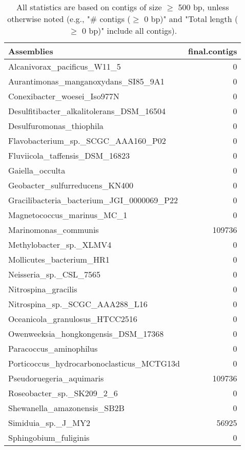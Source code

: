 \documentclass[12pt,a4paper]{article}
\begin{document}
\begin{table}[ht]
\begin{center}
\caption{All statistics are based on contigs of size $\geq$ 500 bp, unless otherwise noted (e.g., "\# contigs ($\geq$ 0 bp)" and "Total length ($\geq$ 0 bp)" include all contigs).}
\begin{tabular}{|l*{1}{|r}|}
\hline
Assemblies & final.contigs \\ \hline
Alcanivorax\_pacificus\_W11\_5 & 0 \\ \hline
Aurantimonas\_manganoxydans\_SI85\_9A1 & 0 \\ \hline
Conexibacter\_woesei\_Iso977N & 0 \\ \hline
Desulfitibacter\_alkalitolerans\_DSM\_16504 & 0 \\ \hline
Desulfuromonas\_thiophila & 0 \\ \hline
Flavobacterium\_sp.\_SCGC\_AAA160\_P02 & 0 \\ \hline
Fluviicola\_taffensis\_DSM\_16823 & 0 \\ \hline
Gaiella\_occulta & 0 \\ \hline
Geobacter\_sulfurreducens\_KN400 & 0 \\ \hline
Gracilibacteria\_bacterium\_JGI\_0000069\_P22 & 0 \\ \hline
Magnetococcus\_marinus\_MC\_1 & 0 \\ \hline
Marinomonas\_communis & 109736 \\ \hline
Methylobacter\_sp.\_XLMV4 & 0 \\ \hline
Mollicutes\_bacterium\_HR1 & 0 \\ \hline
Neisseria\_sp.\_CSL\_7565 & 0 \\ \hline
Nitrospina\_gracilis & 0 \\ \hline
Nitrospina\_sp.\_SCGC\_AAA288\_L16 & 0 \\ \hline
Oceanicola\_granulosus\_HTCC2516 & 0 \\ \hline
Owenweeksia\_hongkongensis\_DSM\_17368 & 0 \\ \hline
Paracoccus\_aminophilus & 0 \\ \hline
Porticoccus\_hydrocarbonoclasticus\_MCTG13d & 0 \\ \hline
Pseudoruegeria\_aquimaris & 109736 \\ \hline
Roseobacter\_sp.\_SK209\_2\_6 & 0 \\ \hline
Shewanella\_amazonensis\_SB2B & 0 \\ \hline
Simiduia\_sp.\_J\_MY2 & 56925 \\ \hline
Sphingobium\_fuliginis & 0 \\ \hline

\end{tabular}
\end{center}
\end{table}
\end{document}
